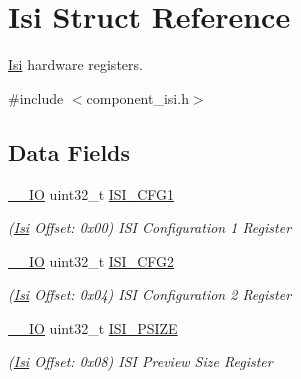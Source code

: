 \hypertarget{structIsi}{}\section{Isi Struct Reference}
\label{structIsi}


\mbox{\hyperlink{structIsi}{Isi}} hardware registers.  




{\ttfamily \#include $<$component\+\_\+isi.\+h$>$}

\subsection*{Data Fields}
\begin{DoxyCompactItemize}
\item 
\mbox{\label{structIsi_a6089baa01e2672efa4297688a954e6af}} 
\mbox{\hyperlink{core__cm7_8h_aec43007d9998a0a0e01faede4133d6be}{\+\_\+\+\_\+\+IO}} uint32\+\_\+t \mbox{\hyperlink{structIsi_a6089baa01e2672efa4297688a954e6af}{I\+S\+I\+\_\+\+C\+F\+G1}}
\begin{DoxyCompactList}\small\item\em (\mbox{\hyperlink{structIsi}{Isi}} Offset\+: 0x00) I\+SI Configuration 1 Register \end{DoxyCompactList}\item 
\mbox{\label{structIsi_a3fb5b6350b9f378d911c83fffea85628}} 
\mbox{\hyperlink{core__cm7_8h_aec43007d9998a0a0e01faede4133d6be}{\+\_\+\+\_\+\+IO}} uint32\+\_\+t \mbox{\hyperlink{structIsi_a3fb5b6350b9f378d911c83fffea85628}{I\+S\+I\+\_\+\+C\+F\+G2}}
\begin{DoxyCompactList}\small\item\em (\mbox{\hyperlink{structIsi}{Isi}} Offset\+: 0x04) I\+SI Configuration 2 Register \end{DoxyCompactList}\item 
\mbox{\label{structIsi_abc04a3b35c2b371a96346d59e02c601c}} 
\mbox{\hyperlink{core__cm7_8h_aec43007d9998a0a0e01faede4133d6be}{\+\_\+\+\_\+\+IO}} uint32\+\_\+t \mbox{\hyperlink{structIsi_abc04a3b35c2b371a96346d59e02c601c}{I\+S\+I\+\_\+\+P\+S\+I\+ZE}}
\begin{DoxyCompactList}\small\item\em (\mbox{\hyperlink{structIsi}{Isi}} Offset\+: 0x08) I\+SI Preview Size Register \end{DoxyCompactList}\item 

\end{DoxyCompactItemize}
